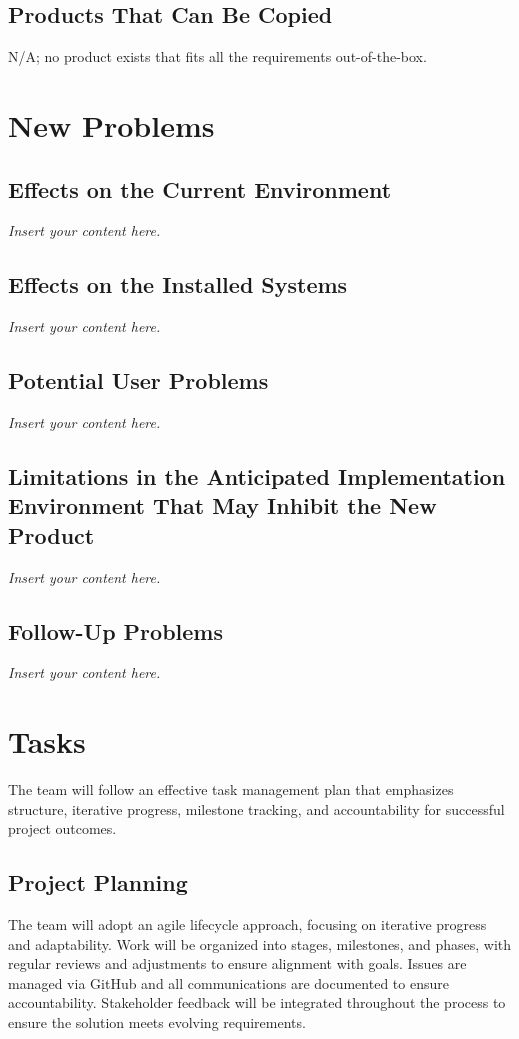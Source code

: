 \documentclass[12pt]{article}
\newcommand{\lips}{\textit{Insert your content here.}}
\begin{document}
\subsection{Products That Can Be Copied}
N/A; no product exists that fits all the requirements out-of-the-box.


\section{New Problems}
\subsection{Effects on the Current Environment}
\lips
\subsection{Effects on the Installed Systems}
\lips
\subsection{Potential User Problems}
\lips
\subsection{Limitations in the Anticipated Implementation Environment That May
Inhibit the New Product}
\lips
\subsection{Follow-Up Problems}
\lips
\section{Tasks}
The team will follow an effective task management plan that emphasizes
structure, iterative progress, milestone tracking, and accountability for
successful project outcomes. 
\subsection{Project Planning}

The team will adopt an agile lifecycle approach, focusing on iterative progress
and adaptability. Work will be organized into stages, milestones, and phases,
with regular reviews and adjustments to ensure alignment with goals. Issues are
managed via GitHub and all communications are documented to ensure
accountability. Stakeholder feedback will be integrated throughout the process
to ensure the solution meets evolving requirements.
\end{document}
